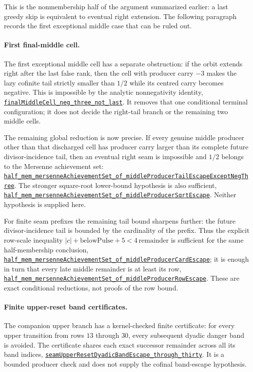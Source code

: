 \documentclass[11pt]{article}
\newcommand{\commit}{81150c1c6fdd4cd51e76d3aa0de344341e0e9e7c}
\newcommand{\repobase}{https://github.com/wcook04/plectis-lean-erdos249-257/blob/\commit}
\newcommand{\PK}{Erdos249257}
\newcommand{\lrefx}[3]{\href{\repobase/\PK/#1\#L#2}{\nolinkurl{#3}}}
\theoremstyle{definition}
\theoremstyle{remark}
\begin{document}
This is the nonmembership half of the argument summarized earlier: a last
greedy skip is equivalent to eventual right extension.  The following
paragraph records the first exceptional middle case that can be ruled out.

\paragraph{First final-middle cell.}  The first exceptional middle cell has a
separate obstruction: if the orbit extends right after the last false rank,
then the cell with producer carry $-3$ makes the lazy cofinite tail strictly
smaller than $1/2$ while its centred carry becomes negative.  This is
impossible by the analytic nonnegativity identity,
\lrefx{HalfCylinderFinalMiddleCellEscape.lean}{587}{finalMiddleCell_neg_three_not_last}.
It removes that one conditional terminal configuration; it does not decide
the right-tail branch or the remaining two middle cells.

The remaining global reduction is now precise.  If every genuine middle
producer other than that discharged cell has producer carry larger than its
complete future divisor-incidence tail, then an eventual right seam is
impossible and $1/2$ belongs to the Mersenne achievement set:
\lrefx{HalfCylinderLastProducerContradiction.lean}{387}{half_mem_mersenneAchievementSet_of_middleProducerTailEscapeExceptNegThree}.
The stronger square-root lower-bound hypothesis is also sufficient,
\lrefx{HalfCylinderLastProducerContradiction.lean}{409}{half_mem_mersenneAchievementSet_of_middleProducerSqrtEscape}.
Neither hypothesis is supplied here.

For finite seam prefixes the remaining tail bound sharpens further: the
future divisor-incidence tail is bounded by the cardinality of the prefix.
Thus the explicit row-scale inequality
\(|c|+\mathrm{belowPulse}+5<4\,\mathrm{remainder}\) is sufficient for
the same half-membership conclusion,
\lrefx{HalfCylinderMiddleCarryLowerBound.lean}{1503}{half_mem_mersenneAchievementSet_of_middleProducerCardEscape};
it is enough in turn that every late middle remainder is at least its row,
\lrefx{HalfCylinderMiddleCarryLowerBound.lean}{1510}{half_mem_mersenneAchievementSet_of_middleProducerRowEscape}.
These are exact conditional reductions, not proofs of the row bound.

\paragraph{Finite upper-reset band certificates.}  The companion upper
branch has a kernel-checked finite certificate: for every upper transition
from rows $13$ through $30$, every subsequent dyadic danger band is avoided.
The certificate shares each exact successor remainder across all its band
indices,
\lrefx{HalfCylinderUpperResetBandCertificates.lean}{78}{seamUpperResetDyadicBandEscape_through_thirty}.
It is a bounded producer check and does not supply the cofinal band-escape
hypothesis.
\end{document}
